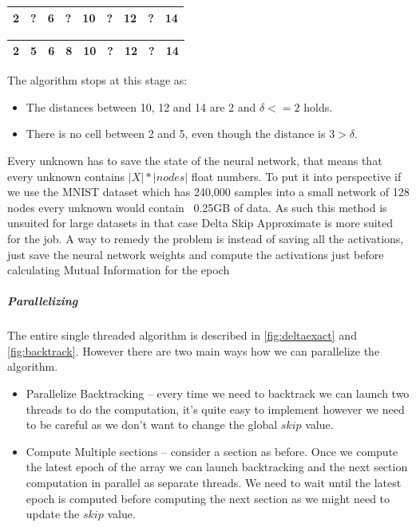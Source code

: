 \documentclass[dissertation.tex]{subfiles}
\begin{document}
  \begin{table}[H]
    \centering
      \begin{tabular}{|c|c|c|c|c|c|c|c|c|}
      \hline			
        2&?&\bf{6}&?&10&?&\bf{12}&?&14\\
      \hline  
    \end{tabular}
  \end{table}

  \begin{table}[H]
    \centering
      \begin{tabular}{|c|c|c|c|c|c|c|c|c|}
      \hline			
        2&\bf{5}&6&\bf{8}&10&?&12&?&14\\
      \hline  
    \end{tabular}
  \end{table}

  The algorithm stops at this stage as:
  \begin{itemize}
    \item{
        The distances between 10, 12 and 14 are 2 and $\delta <= 2$ holds.
      }
    \item{
        There is no cell between 2 and 5, even though the distance is $3 >
        \delta$.
      }
  \end{itemize}

  Every unknown has to save the state of the neural network, that means that
  every unknown contains $|X|*|nodes|$ float numbers. To put it into perspective
  if we use the MNIST dataset which has 240,000 samples into a small network of
  128 nodes every unknown would contain ~0.25GB of data. As such this method is
  unsuited for large datasets in that case Delta Skip Approximate is more suited
  for the job. A way to remedy the problem is instead of saving all the
  activations, just save the neural network weights and compute the activations
  just before calculating Mutual Information for the epoch
  
  \subparagraph{Parallelizing} 
  The entire single threaded algorithm is described in \autoref{fig:deltaexact}
  and \autoref{fig:backtrack}. However there are two main ways how we can
  parallelize the algorithm.
  \begin{itemize}
    \item{
        Parallelize Backtracking -- every time we need to backtrack we can
        launch two threads to do the computation, it's quite easy to implement
        however we need to be careful as we don't want to change the global
        $skip$ value.
      }
    \item{
        Compute Multiple sections -- consider a section as before.
        Once we compute the latest epoch of the array we can launch backtracking
        and the next section computation in parallel as separate threads.
        We need to wait until the latest epoch is computed before computing the
        next section as we might need to
        update the $skip$ value.
      }
  \end{itemize}
\end{document}

